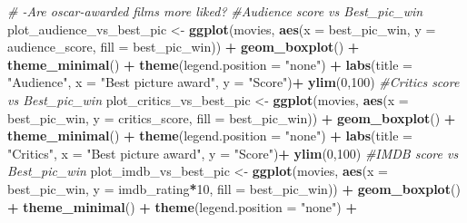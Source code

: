 \documentclass[]{article}
\newenvironment{Shaded}{\begin{snugshade}}{\end{snugshade}}
\newcommand{\KeywordTok}[1]{\textcolor[rgb]{0.13,0.29,0.53}{\textbf{#1}}}
\newcommand{\DataTypeTok}[1]{\textcolor[rgb]{0.13,0.29,0.53}{#1}}
\newcommand{\DecValTok}[1]{\textcolor[rgb]{0.00,0.00,0.81}{#1}}
\newcommand{\StringTok}[1]{\textcolor[rgb]{0.31,0.60,0.02}{#1}}
\newcommand{\CommentTok}[1]{\textcolor[rgb]{0.56,0.35,0.01}{\textit{#1}}}
\newcommand{\OperatorTok}[1]{\textcolor[rgb]{0.81,0.36,0.00}{\textbf{#1}}}
\newcommand{\NormalTok}[1]{#1}
\begin{document}
\begin{Shaded}
\begin{Highlighting}[]
\CommentTok{# -Are oscar-awarded films more liked?}
\CommentTok{#Audience score vs Best_pic_win}
\NormalTok{plot_audience_vs_best_pic <-}
\StringTok{  }\KeywordTok{ggplot}\NormalTok{(movies,}
         \KeywordTok{aes}\NormalTok{(}\DataTypeTok{x =}\NormalTok{ best_pic_win, }\DataTypeTok{y =}\NormalTok{ audience_score, }\DataTypeTok{fill =}\NormalTok{ best_pic_win)) }\OperatorTok{+}
\StringTok{  }\KeywordTok{geom_boxplot}\NormalTok{() }\OperatorTok{+}
\StringTok{  }\KeywordTok{theme_minimal}\NormalTok{() }\OperatorTok{+}
\StringTok{  }\KeywordTok{theme}\NormalTok{(}\DataTypeTok{legend.position =} \StringTok{"none"}\NormalTok{) }\OperatorTok{+}
\StringTok{  }\KeywordTok{labs}\NormalTok{(}\DataTypeTok{title =} \StringTok{"Audience"}\NormalTok{, }\DataTypeTok{x =} \StringTok{"Best picture award"}\NormalTok{, }\DataTypeTok{y =} \StringTok{"Score"}\NormalTok{)}\OperatorTok{+}
\StringTok{  }\KeywordTok{ylim}\NormalTok{(}\DecValTok{0}\NormalTok{,}\DecValTok{100}\NormalTok{)}
\CommentTok{#Critics score vs Best_pic_win}
\NormalTok{plot_critics_vs_best_pic <-}
\StringTok{  }\KeywordTok{ggplot}\NormalTok{(movies,}
         \KeywordTok{aes}\NormalTok{(}\DataTypeTok{x =}\NormalTok{ best_pic_win, }\DataTypeTok{y =}\NormalTok{ critics_score, }\DataTypeTok{fill =}\NormalTok{ best_pic_win)) }\OperatorTok{+}
\StringTok{  }\KeywordTok{geom_boxplot}\NormalTok{() }\OperatorTok{+}
\StringTok{  }\KeywordTok{theme_minimal}\NormalTok{() }\OperatorTok{+}
\StringTok{  }\KeywordTok{theme}\NormalTok{(}\DataTypeTok{legend.position =} \StringTok{"none"}\NormalTok{) }\OperatorTok{+}
\StringTok{  }\KeywordTok{labs}\NormalTok{(}\DataTypeTok{title =} \StringTok{"Critics"}\NormalTok{, }\DataTypeTok{x =} \StringTok{"Best picture award"}\NormalTok{, }\DataTypeTok{y =} \StringTok{"Score"}\NormalTok{)}\OperatorTok{+}
\StringTok{  }\KeywordTok{ylim}\NormalTok{(}\DecValTok{0}\NormalTok{,}\DecValTok{100}\NormalTok{)}
\CommentTok{#IMDB score vs Best_pic_win}
\NormalTok{plot_imdb_vs_best_pic <-}
\StringTok{  }\KeywordTok{ggplot}\NormalTok{(movies, }\KeywordTok{aes}\NormalTok{(}\DataTypeTok{x =}\NormalTok{ best_pic_win, }\DataTypeTok{y =}\NormalTok{ imdb_rating}\OperatorTok{*}\DecValTok{10}\NormalTok{, }\DataTypeTok{fill =}\NormalTok{ best_pic_win)) }\OperatorTok{+}
\StringTok{  }\KeywordTok{geom_boxplot}\NormalTok{() }\OperatorTok{+}
\StringTok{  }\KeywordTok{theme_minimal}\NormalTok{() }\OperatorTok{+}
\StringTok{  }\KeywordTok{theme}\NormalTok{(}\DataTypeTok{legend.position =} \StringTok{"none"}\NormalTok{) }\OperatorTok{+}

\end{Highlighting}
\end{Shaded}
\end{document}
